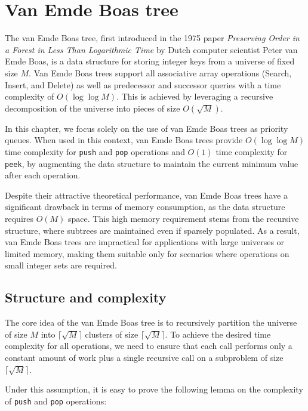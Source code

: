 \section{Van Emde Boas tree}

The van Emde Boas tree, first introduced in the 1975 paper \emph{Preserving Order in a Forest in Less Than Logarithmic Time} \cite{vanEmdeBoas1975} by Dutch computer scientist Peter van Emde Boas, is a data structure for storing integer keys from a universe of fixed size \( M \). Van Emde Boas trees support all associative array operations (Search, Insert, and Delete) as well as predecessor and successor queries with a time complexity of \( O(\log \log M) \). This is achieved by leveraging a recursive decomposition of the universe into pieces of size \( O(\sqrt{M}) \). 

In this chapter, we focus solely on the use of van Emde Boas trees as priority queues. When used in this context, van Emde Boas trees provide \( O(\log \log M) \) time complexity for \texttt{push} and \texttt{pop} operations and \( O(1) \) time complexity for \texttt{peek}, by augmenting the data structure to maintain the current minimum value after each operation.

Despite their attractive theoretical performance, van Emde Boas trees have a significant drawback in terms of memory consumption, as the data structure requires \( O(M) \) space. This high memory requirement stems from the recursive structure, where subtrees are maintained even if sparsely populated. As a result, van Emde Boas trees are impractical for applications with large universes or limited memory, making them suitable only for scenarios where operations on small integer sets are required.

\subsection{Structure and complexity}

The core idea of the van Emde Boas tree is to recursively partition the universe of size \( M \) into \( \lceil \sqrt{M} \rceil \) clusters of size \( \lceil \sqrt{M} \rceil \). To achieve the desired time complexity for all operations, we need to ensure that each call performs only a constant amount of work plus a single recursive call on a subproblem of size \( \lceil \sqrt{M} \rceil \). 

Under this assumption, it is easy to prove the following lemma on the complexity of \texttt{push} and \texttt{pop} operations:

